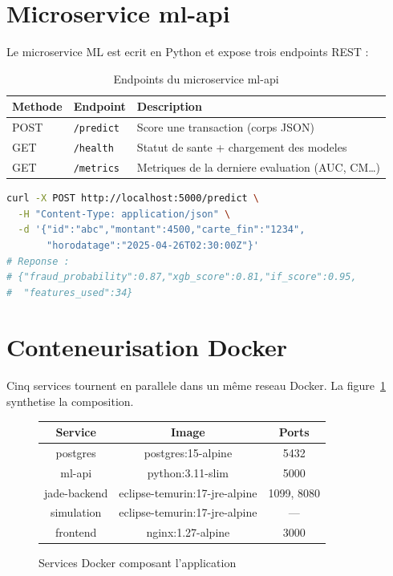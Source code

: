 \documentclass[12pt,a4paper,oneside]{report}
\begin{document}
\section{Microservice ml-api}

Le microservice ML est ecrit en Python et expose trois endpoints REST :

\begin{table}[H]
\centering
\caption{Endpoints du microservice ml-api}
\label{tab:ml-api}
\renewcommand{\arraystretch}{1.3}
\begin{tabularx}{\textwidth}{l l X}
\toprule
\textbf{Methode} & \textbf{Endpoint} & \textbf{Description} \\
\midrule
POST & \texttt{/predict} & Score une transaction (corps JSON) \\
GET  & \texttt{/health}  & Statut de sante + chargement des modeles \\
GET  & \texttt{/metrics} & Metriques de la derniere evaluation (AUC, CM\dots) \\
\bottomrule
\end{tabularx}
\end{table}

\begin{lstlisting}[language=bash,caption={Exemple d'appel a /predict},label=lst:predict]
curl -X POST http://localhost:5000/predict \
  -H "Content-Type: application/json" \
  -d '{"id":"abc","montant":4500,"carte_fin":"1234",
       "horodatage":"2025-04-26T02:30:00Z"}'
# Reponse :
# {"fraud_probability":0.87,"xgb_score":0.81,"if_score":0.95,
#  "features_used":34}
\end{lstlisting}

\section{Conteneurisation Docker}

Cinq services tournent en parallele dans un m\^eme reseau Docker. La
figure~\ref{fig:docker-services} synthetise la composition.

\begin{figure}[H]
\centering
\begin{tabular}{|c|c|c|}
\hline
\textbf{Service} & \textbf{Image} & \textbf{Ports} \\
\hline
postgres      & postgres:15-alpine                & 5432 \\
ml-api        & python:3.11-slim                  & 5000 \\
jade-backend  & eclipse-temurin:17-jre-alpine     & 1099, 8080 \\
simulation    & eclipse-temurin:17-jre-alpine     & --- \\
frontend      & nginx:1.27-alpine                 & 3000 \\
\hline
\end{tabular}
\caption{Services Docker composant l'application}
\label{fig:docker-services}
\end{figure}
\end{document}
